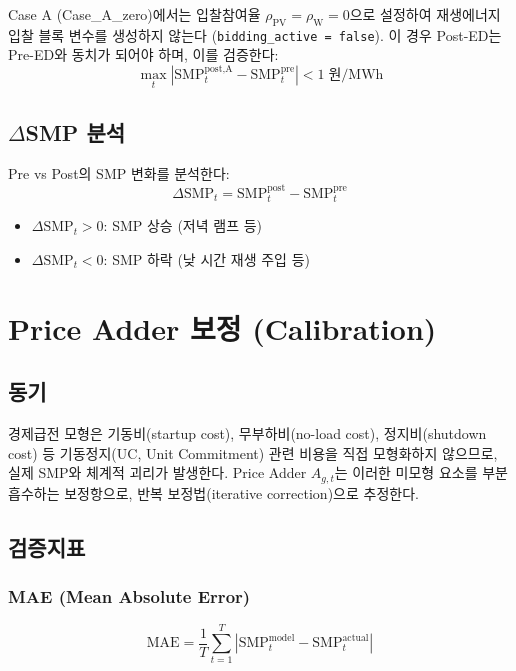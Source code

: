 \documentclass[11pt, a4paper]{article}
\begin{document}
Case A (Case\_A\_zero)에서는 입찰참여율 $\rho_{\text{PV}} = \rho_{\text{W}} = 0$으로 설정하여
재생에너지 입찰 블록 변수를 생성하지 않는다 (\texttt{bidding\_active = false}).
이 경우 Post-ED는 Pre-ED와 동치가 되어야 하며, 이를 검증한다:
\begin{equation}
    \max_t |\text{SMP}_t^{\text{post,A}} - \text{SMP}_t^{\text{pre}}| < 1 \; \text{원/MWh}
\end{equation}

\subsection{$\Delta$SMP 분석}

Pre vs Post의 SMP 변화를 분석한다:
\begin{equation}\label{eq:delta_smp}
    \Delta\text{SMP}_t = \text{SMP}_t^{\text{post}} - \text{SMP}_t^{\text{pre}}
\end{equation}
\begin{itemize}[noitemsep]
    \item $\Delta\text{SMP}_t > 0$: SMP 상승 (저녁 램프 등)
    \item $\Delta\text{SMP}_t < 0$: SMP 하락 (낮 시간 재생 주입 등)
\end{itemize}


\section{Price Adder 보정 (Calibration)}\label{sec:calibrate}

\subsection{동기}

경제급전 모형은 기동비(startup cost), 무부하비(no-load cost), 정지비(shutdown cost) 등
기동정지(UC, Unit Commitment) 관련 비용을 직접 모형화하지 않으므로,
실제 SMP와 체계적 괴리가 발생한다.
Price Adder $A_{g,t}$는 이러한 미모형 요소를 부분 흡수하는 보정항으로,
반복 보정법(iterative correction)으로 추정한다.

\subsection{검증지표}

\subsubsection{MAE (Mean Absolute Error)}
\begin{equation}\label{eq:mae}
    \text{MAE} = \frac{1}{T} \sum_{t=1}^{T} |\text{SMP}_t^{\text{model}} - \text{SMP}_t^{\text{actual}}|
\end{equation}
\end{document}
